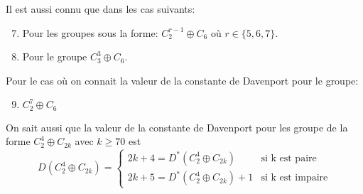 \documentclass[12pt, openany]{report}
\begin{document}
Il est aussi connu que  dans les cas suivants: 

\begin{enumerate}
\setcounter{enumi}{6}
\item Pour les groupes sous la forme: $C_{2}^{r-1} \oplus C_{6}$ où $r \in \{5,6,7\}.$
\item Pour le groupe $C_{3}^{3} \oplus C_{6}$. 
\end{enumerate}

Pour le cas où  on connait la valeur de la constante de Davenport pour le groupe: 

\begin{enumerate}
\setcounter{enumi}{8}
\item $C_{2}^{7} \oplus C_{6}$
\end{enumerate}

On sait aussi que la valeur de la constante de Davenport pour les groupe de la forme $C_{2}^{4} \oplus C_{2k}$ avec $k \geq 70$ est %
$$
D(C_{2}^{4} \oplus C_{2k}) = \left\{
    \begin{array}{ll}
        2k+4 = D^{*}(C_{2}^{4} \oplus C_{2k})& \mbox{si k est paire} \\
        2k+5 = D^{*}(C_{2}^{4} \oplus C_{2k})+1& \mbox{si k est impaire}
    \end{array}
\right.
$$





\end{document}
